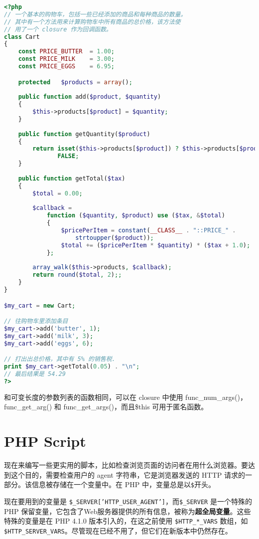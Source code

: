 \begin{lstlisting}[language=PHP]
<?php
// 一个基本的购物车，包括一些已经添加的商品和每种商品的数量。
// 其中有一个方法用来计算购物车中所有商品的总价格，该方法使
// 用了一个 closure 作为回调函数。
class Cart
{
    const PRICE_BUTTER  = 1.00;
    const PRICE_MILK    = 3.00;
    const PRICE_EGGS    = 6.95;

    protected   $products = array();
    
    public function add($product, $quantity)
    {
        $this->products[$product] = $quantity;
    }
    
    public function getQuantity($product)
    {
        return isset($this->products[$product]) ? $this->products[$product] :
               FALSE;
    }
    
    public function getTotal($tax)
    {
        $total = 0.00;
        
        $callback =
            function ($quantity, $product) use ($tax, &$total)
            {
                $pricePerItem = constant(__CLASS__ . "::PRICE_" .
                    strtoupper($product));
                $total += ($pricePerItem * $quantity) * ($tax + 1.0);
            };
        
        array_walk($this->products, $callback);
        return round($total, 2);;
    }
}

$my_cart = new Cart;

// 往购物车里添加条目
$my_cart->add('butter', 1);
$my_cart->add('milk', 3);
$my_cart->add('eggs', 6);

// 打出出总价格，其中有 5% 的销售税.
print $my_cart->getTotal(0.05) . "\n";
// 最后结果是 54.29
?>
\end{lstlisting}

和可变长度的参数列表的函数相同，可以在 closure 中使用 func\_num\_args()， func\_get\_arg() 和 func\_get\_args()，而且\$this 可用于匿名函数。


\chapter{PHP Script}


现在来编写一些更实用的脚本，比如检查浏览页面的访问者在用什么浏览器。要达到这个目的，需要检查用户的 agent 字符串，它是浏览器发送的 HTTP 请求的一部分。该信息被存储在一个变量中。在 PHP 中，变量总是以\texttt{\$}开头。

现在要用到的变量是 \texttt{\$\_SERVER['HTTP\_USER\_AGENT']}，而\texttt{\$\_SERVER} 是一个特殊的 PHP 保留变量，它包含了Web服务器提供的所有信息，被称为\textbf{超全局变量}。这些特殊的变量是在 PHP 4.1.0 版本引入的，在这之前使用 \texttt{\$HTTP\_*\_VARS} 数组，如 \texttt{\$HTTP\_SERVER\_VARS}。尽管现在已经不用了，但它们在新版本中仍然存在。

